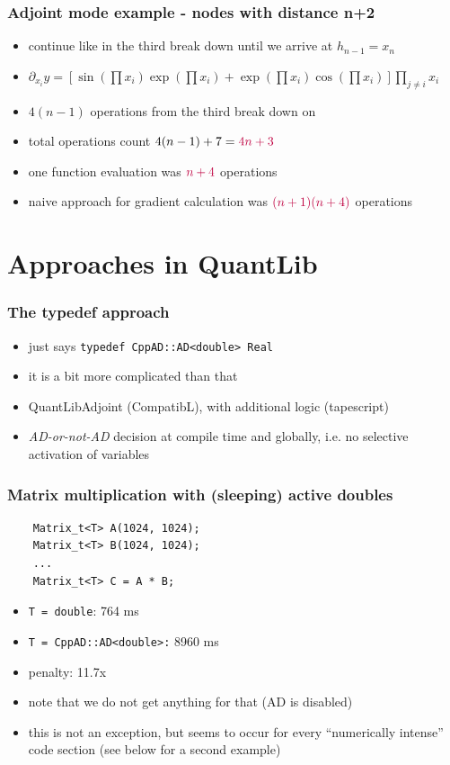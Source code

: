 \documentclass[10pt,German]{beamer}
\begin{document}
\begin{frame}[fragile]
\frametitle{Adjoint mode example - nodes with distance n+2}
\begin{itemize}
\item continue like in the third break down until we arrive at $h_{n-1} = x_n$
\item $\partial_{x_i} y = \left[\sin(\prod x_i)\exp(\prod x_i)+\exp(\prod x_i)\cos(\prod x_i)\right] \prod_{j\neq i} x_i$
\item $4(n-1)$ operations from the third break down on
\item total operations count $4(n-1)+7 = \textcolor{purple}{4n+3}$
\item one function evaluation was $\textcolor{purple}{n+4}$ operations
\item naive approach for gradient calculation was $\textcolor{purple}{(n+1)(n+4)}$ operations
\end{itemize}
\end{frame}

\section{Approaches in QuantLib}

\begin{frame}[fragile]
\frametitle{The typedef approach}
\begin{itemize}
\item just says \verb+typedef CppAD::AD<double> Real+
\item it is a bit more complicated than that
\item QuantLibAdjoint (CompatibL), with additional logic (tapescript)
\item \textit{AD-or-not-AD} decision at compile time and globally, i.e. no selective activation of variables
\end{itemize}
\end{frame}

\begin{frame}[fragile]
\frametitle{Matrix multiplication with (sleeping) active doubles}
\begin{verbatim}
    Matrix_t<T> A(1024, 1024);
    Matrix_t<T> B(1024, 1024);
    ...
    Matrix_t<T> C = A * B;
\end{verbatim}
\begin{itemize}
\item \verb+T = double+: 764 ms
\item \verb+T = CppAD::AD<double>:+ 8960 ms
\item penalty: 11.7x
\item note that we do not get anything for that (AD is disabled)
\item this is not an exception, but seems to occur for every ``numerically intense'' code section (see below for a second example)
\end{itemize}
\end{frame}
\end{document}
